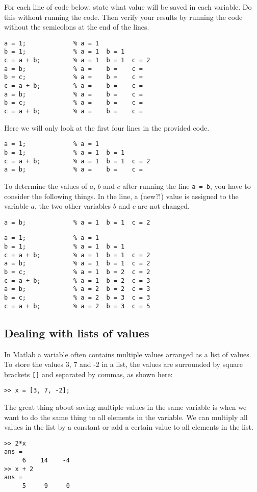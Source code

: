 \begin{ex}
For each line of code below, state what value will be saved in each variable.
Do this without running the code.
Then verify your results by running the code without the semicolons at the 
end of the lines.
\begin{lstlisting}
a = 1;             % a = 1
b = 1;             % a = 1  b = 1 
c = a + b;         % a = 1  b = 1  c = 2
a = b;             % a =    b =    c = 
b = c;             % a =    b =    c = 
c = a + b;         % a =    b =    c = 
a = b;             % a =    b =    c = 
b = c;             % a =    b =    c = 
c = a + b;         % a =    b =    c = 
\end{lstlisting}
\begin{hint}
Here we will only look at the first four lines in the provided code.
\begin{lstlisting}
a = 1;             % a = 1
b = 1;             % a = 1  b = 1 
c = a + b;         % a = 1  b = 1  c = 2
a = b;             % a =    b =    c = 
\end{lstlisting}
To determine the values of $a$, $b$ and $c$ after running 
the line \verb!a = b!, you have to consider the following things.
In the line, a (new?!) value is assigned to the variable $a$, the
two other variables $b$ and $c$ are not changed.
\begin{lstlisting}
a = b;             % a = 1  b = 1  c = 2
\end{lstlisting}
\end{hint}
\begin{sol}
\begin{lstlisting}
a = 1;             % a = 1
b = 1;             % a = 1  b = 1 
c = a + b;         % a = 1  b = 1  c = 2
a = b;             % a = 1  b = 1  c = 2
b = c;             % a = 1  b = 2  c = 2
c = a + b;         % a = 1  b = 2  c = 3
a = b;             % a = 2  b = 2  c = 3
b = c;             % a = 2  b = 3  c = 3
c = a + b;         % a = 2  b = 3  c = 5
\end{lstlisting}
\end{sol}
\end{ex}




\subsection{Dealing with lists of values}

In Matlab a variable often contains multiple values arranged as a list of values.
To store the values 3, 7 and  -2 in a list, the values are surrounded by square brackets 
\verb![]! and separated by commas, as shown here:
\begin{lstlisting}
>> x = [3, 7, -2];
\end{lstlisting}
The great thing about saving multiple values in the same variable is when we 
want to do the same thing to all elements in the variable.
We can multiply all values in the list by a constant or add a certain value to all 
elements in the list.
\begin{lstlisting}
>> 2*x
ans = 
     6    14    -4
>> x + 2
ans = 
     5     9     0
\end{lstlisting}

